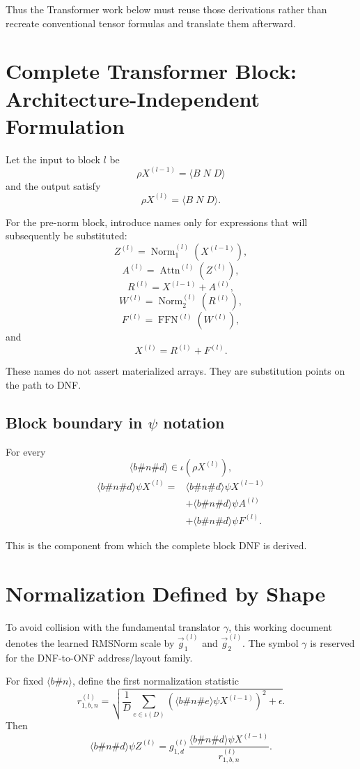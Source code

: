 \documentclass[11pt]{article}
\newcommand{\Norm}{\operatorname{Norm}}
\newcommand{\Attn}{\operatorname{Attn}}
\newcommand{\FFN}{\operatorname{FFN}}
\begin{document}
Thus the Transformer work below must reuse those derivations rather than recreate conventional
tensor formulas and translate them afterward.

\section{Complete Transformer Block: Architecture-Independent Formulation}

Let the input to block \(l\) be
\[
\boxed{
\rho X^{(l-1)}=\langle B\;N\;D\rangle
}
\]
and the output satisfy
\[
\boxed{
\rho X^{(l)}=\langle B\;N\;D\rangle.
}
\]

For the pre-norm block, introduce names only for expressions that will subsequently be substituted:
\[
Z^{(l)}=\Norm_1^{(l)}(X^{(l-1)}),
\]
\[
A^{(l)}=\Attn^{(l)}(Z^{(l)}),
\]
\[
R^{(l)}=X^{(l-1)}+A^{(l)},
\]
\[
W^{(l)}=\Norm_2^{(l)}(R^{(l)}),
\]
\[
F^{(l)}=\FFN^{(l)}(W^{(l)}),
\]
and
\[
\boxed{X^{(l)}=R^{(l)}+F^{(l)}.}
\]

These names do not assert materialized arrays.  They are substitution points on the path to DNF.

\subsection{Block boundary in \(\psi\) notation}

For every
\[
\langle b\#n\#d\rangle\in\iota(\rho X^{(l)}),
\]
\[
\boxed{
\begin{aligned}
\langle b\#n\#d\rangle\psi X^{(l)}
={}&
\langle b\#n\#d\rangle\psi X^{(l-1)}
\\
&+
\langle b\#n\#d\rangle\psi A^{(l)}
\\
&+
\langle b\#n\#d\rangle\psi F^{(l)}.
\end{aligned}}
\]

This is the component from which the complete block DNF is derived.

\section{Normalization Defined by Shape}

To avoid collision with the fundamental translator \(\gamma\), this working document denotes the
learned RMSNorm scale by \(\vec g_1^{(l)}\) and \(\vec g_2^{(l)}\).  The symbol \(\gamma\) is
reserved for the DNF-to-ONF address/layout family.

For fixed \(\langle b\#n\rangle\), define the first normalization statistic
\[
\boxed{
r^{(l)}_{1,b,n}
=
\sqrt{
\frac{1}{D}
\sum_{e\in\iota(D)}
\left(
\langle b\#n\#e\rangle\psi X^{(l-1)}
\right)^2+\epsilon
}.
}
\]
Then
\[
\boxed{
\langle b\#n\#d\rangle\psi Z^{(l)}
=
g^{(l)}_{1,d}
\frac{
\langle b\#n\#d\rangle\psi X^{(l-1)}
}{
r^{(l)}_{1,b,n}
}.
}
\]
\end{document}
